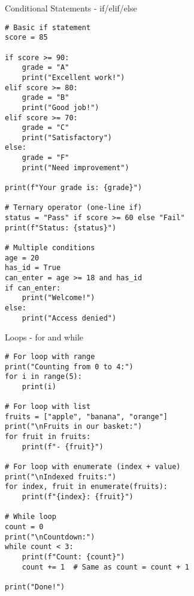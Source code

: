 \begin{frame}[fragile]{Conditional Statements - if/elif/else}
    \begin{codeblock}
        \begin{lstlisting}
# Basic if statement
score = 85

if score >= 90:
    grade = "A"
    print("Excellent work!")
elif score >= 80:
    grade = "B"
    print("Good job!")
elif score >= 70:
    grade = "C"
    print("Satisfactory")
else:
    grade = "F"
    print("Need improvement")

print(f"Your grade is: {grade}")

# Ternary operator (one-line if)
status = "Pass" if score >= 60 else "Fail"
print(f"Status: {status}")

# Multiple conditions
age = 20
has_id = True
can_enter = age >= 18 and has_id
if can_enter:
    print("Welcome!")
else:
    print("Access denied")
        \end{lstlisting}
    \end{codeblock}
\end{frame}

\begin{frame}[fragile]{Loops - for and while}
    \begin{codeblock}
        \begin{lstlisting}
# For loop with range
print("Counting from 0 to 4:")
for i in range(5):
    print(i)

# For loop with list
fruits = ["apple", "banana", "orange"]
print("\nFruits in our basket:")
for fruit in fruits:
    print(f"- {fruit}")

# For loop with enumerate (index + value)
print("\nIndexed fruits:")
for index, fruit in enumerate(fruits):
    print(f"{index}: {fruit}")

# While loop
count = 0
print("\nCountdown:")
while count < 3:
    print(f"Count: {count}")
    count += 1  # Same as count = count + 1

print("Done!")
        \end{lstlisting}
    \end{codeblock}
\end{frame}

